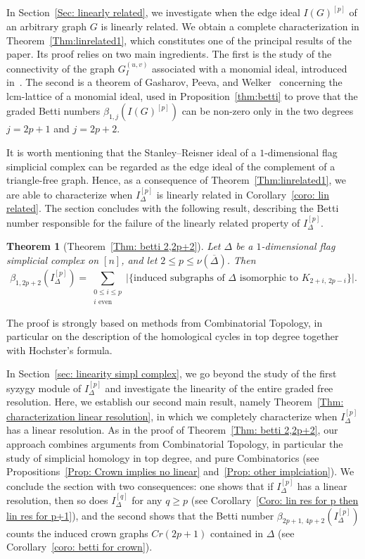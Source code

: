 \documentclass[12pt]{amsart}
\newtheorem{Theorem}{Theorem}[section]
\begin{document}
 In Section~\ref{Sec: linearly related}, we investigate when the edge ideal $I(G)^{[p]}$ of an arbitrary graph $G$ is linearly related. We obtain a complete characterization in Theorem~\ref{Thm:linrelated1}, which constitutes one of the principal results of the paper. Its proof relies on two main ingredients. The first is the study of the connectivity of the graph $G_I^{(u,v)}$ associated with a monomial ideal, introduced in~\cite[Corollary~2.2]{BHZ}. The second is a theorem of Gasharov, Peeva, and Welker~\cite{Gasharov1999} concerning the lcm-lattice of a monomial ideal, used in Proposition~\ref{thm:betti} to prove that the graded Betti numbers $\beta_{1,j}(I(G)^{[p]})$ can be non-zero only in the two degrees $j=2p+1$ and $j=2p+2.$ 

It is worth mentioning that the Stanley--Reisner ideal of a $1$-dimensional flag simplicial complex can be regarded as the edge ideal of the complement of a triangle-free graph. Hence, as a consequence of Theorem~\ref{Thm:linrelated1}, we are able to characterize when $I_{\Delta}^{[p]}$ is linearly related in Corollary~\ref{coro: lin related}. The section concludes with the following result, describing the Betti number responsible for the failure of the linearly related property of $I_{\Delta}^{[p]}$. 

\begin{Theorem}[Theorem~\ref{Thm: betti 2,2p+2}]
Let $\Delta$ be a $1$-dimensional flag simplicial complex on $[n]$, and let $2 \leq p \leq \nu(\overline{\Delta})$. Then
$$
\beta_{1,2p+2}(I_{\Delta}^{[p]})
=
\sum_{\substack{0 \leq i \leq p \\ i \text{ even}}}
\Big|
\big\{
\text{induced subgraphs of } \Delta
\text{ isomorphic to } K_{2+i,\,2p-i}
\big\}
\Big|.
$$
\end{Theorem}

The proof is strongly based on methods from Combinatorial Topology, in particular on the description of the homological cycles in top degree together with Hochster's formula.

In Section~\ref{sec: linearity simpl complex}, we go beyond the study of the first syzygy module of $I_{\Delta}^{[p]}$ and investigate the linearity of the entire graded free resolution. Here, we establish our second main result, namely Theorem~\ref{Thm: characterization linear resolution}, in which we completely characterize when $I_{\Delta}^{[p]}$ has a linear resolution. As in the proof of Theorem~\ref{Thm: betti 2,2p+2}, our approach combines arguments from Combinatorial Topology, in particular the study of simplicial homology in top degree, and pure Combinatorics (see Propositions~\ref{Prop: Crown implies no linear} and~\ref{Prop: other implciation}). We conclude the section with two consequences: one shows that if $I_{\Delta}^{[p]}$ has a linear resolution, then so does $I_{\Delta}^{[q]}$ for any $q\geq p$ (see Corollary~\ref{Coro: lin res for p then lin res for p+1}), and the second shows that the Betti number $\beta_{2p+1,\,4p+2}(I_{\Delta}^{[p]})$ counts the induced crown graphs $Cr(2p+1)$ contained in $\Delta$ (see Corollary~\ref{coro: betti for crown}).
\end{document}
